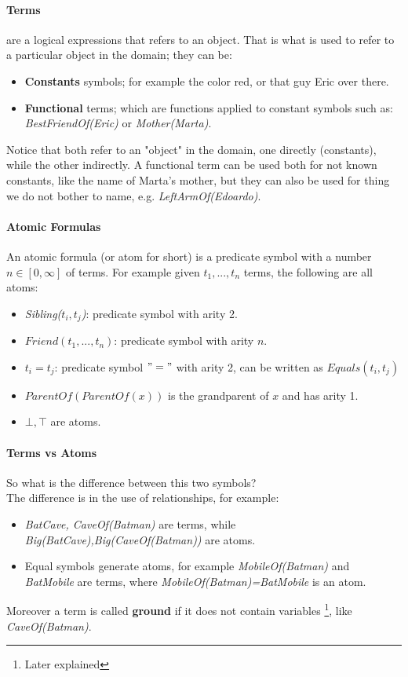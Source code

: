 \documentclass[10pt,a4paper]{article}
\begin{document}
\paragraph{Terms}
are a logical expressions that refers to an object. That is what is used to refer to a particular object in the domain; they can be:
\begin{itemize}
\item \textbf{Constants} symbols; for example the color red, or that guy Eric over there.
\item \textbf{Functional} terms; which are functions applied to constant symbols such as: \textit{BestFriendOf(Eric)} or \textit{Mother(Marta)}.
\end{itemize}
Notice that both refer to an "object" in the domain, one directly (constants), while the other indirectly. A functional term can be used both for not known constants, like the name of Marta's mother, but they can also be used for thing we do not bother to name, e.g. \textit{LeftArmOf(Edoardo)}. 

\paragraph{Atomic Formulas}
An atomic formula (or atom for short) is a predicate symbol with a number $n\in [0,\infty]$ of terms. For example given $t_1,...,t_n$ terms, the following are all atoms:
\begin{itemize}
\item \textit{Sibling($t_i,t_j$)}:  predicate symbol with arity 2.
\item $Friend(t_1,...,t_n)$: predicate symbol with arity $n$.
\item $t_i=t_j$: predicate symbol $" = "$ with arity 2, can be written as $Equals(t_i,t_j)$
\item $ParentOf(ParentOf(x))$ is the grandparent of $x$ and has arity 1.
\item $\bot ,\top$ are atoms.
\end{itemize}

\paragraph{Terms vs Atoms}
So what is the difference between this two symbols?\\
The difference is in the use of relationships, for example:
\begin{itemize}
\item \textit{BatCave, CaveOf(Batman)} are terms, while \textit{Big(BatCave),Big(CaveOf(Batman))} are atoms.
\item Equal symbols generate atoms, for example \textit{MobileOf(Batman)} and \textit{BatMobile} are terms, where \textit{MobileOf(Batman)=BatMobile} is an atom.
\end{itemize}
Moreover a term is called \textbf{ground} if it does not contain variables \footnote{Later explained}, like \textit{CaveOf(Batman)}.
\end{document}

